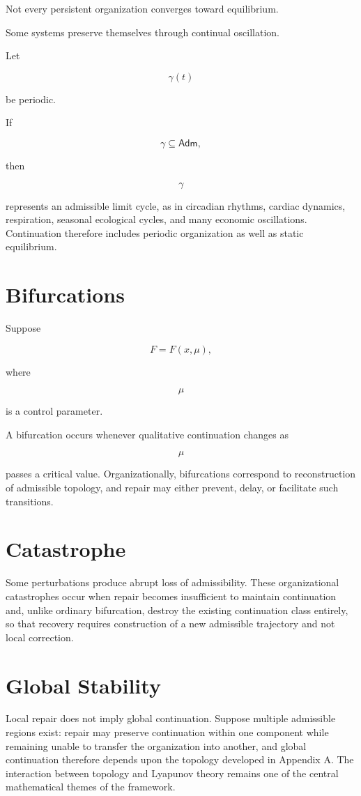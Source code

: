 \documentclass[11pt,oneside]{book}
\numberwithin{equation}{chapter}
\theoremstyle{definition}
\theoremstyle{plain}
\newcommand{\Adm}{\mathsf{Adm}}
\begin{document}
Not every persistent organization converges toward equilibrium.

Some systems preserve themselves through continual oscillation.

Let

\[
\gamma(t)
\]

be periodic.

If

\[
\gamma
\subseteq
\Adm,
\]

then

\[
\gamma
\]

represents an admissible limit cycle, as in circadian rhythms, cardiac dynamics, respiration, seasonal ecological cycles, and many economic oscillations. Continuation therefore includes periodic organization as well as static equilibrium.

\section{Bifurcations}

Suppose

\[
F
=
F(x,\mu),
\]

where

\[
\mu
\]

is a control parameter.

A bifurcation occurs whenever qualitative continuation changes as

\[
\mu
\]

passes a critical value. Organizationally, bifurcations correspond to reconstruction of admissible topology, and repair may either prevent, delay, or facilitate such transitions.

\section{Catastrophe}

Some perturbations produce abrupt loss of admissibility. These organizational catastrophes occur when repair becomes insufficient to maintain continuation and, unlike ordinary bifurcation, destroy the existing continuation class entirely, so that recovery requires construction of a new admissible trajectory and not local correction.

\section{Global Stability}

Local repair does not imply global continuation. Suppose multiple admissible regions exist: repair may preserve continuation within one component while remaining unable to transfer the organization into another, and global continuation therefore depends upon the topology developed in Appendix A. The interaction between topology and Lyapunov theory remains one of the central mathematical themes of the framework.
\end{document}

